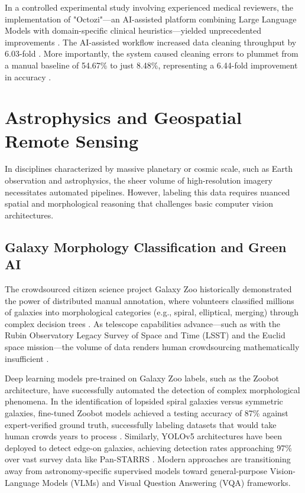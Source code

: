 \documentclass[conference]{IEEEtran}
\begin{document}
In a controlled experimental study involving experienced medical reviewers, the implementation of "Octozi"---an AI-assisted platform combining Large Language Models with domain-specific clinical heuristics---yielded unprecedented improvements \cite{ref32}. The AI-assisted workflow increased data cleaning throughput by 6.03-fold \cite{ref32}. More importantly, the system caused cleaning errors to plummet from a manual baseline of 54.67\% to just 8.48\%, representing a 6.44-fold improvement in accuracy \cite{ref32}.

\section{Astrophysics and Geospatial Remote Sensing}
In disciplines characterized by massive planetary or cosmic scale, such as Earth observation and astrophysics, the sheer volume of high-resolution imagery necessitates automated pipelines. However, labeling this data requires nuanced spatial and morphological reasoning that challenges basic computer vision architectures.

\subsection{Galaxy Morphology Classification and Green AI}
The crowdsourced citizen science project Galaxy Zoo historically demonstrated the power of distributed manual annotation, where volunteers classified millions of galaxies into morphological categories (e.g., spiral, elliptical, merging) through complex decision trees \cite{ref37}. As telescope capabilities advance---such as with the Rubin Observatory Legacy Survey of Space and Time (LSST) and the Euclid space mission---the volume of data renders human crowdsourcing mathematically insufficient \cite{ref37}.

Deep learning models pre-trained on Galaxy Zoo labels, such as the Zoobot architecture, have successfully automated the detection of complex morphological phenomena. In the identification of lopsided spiral galaxies versus symmetric galaxies, fine-tuned Zoobot models achieved a testing accuracy of 87\% against expert-verified ground truth, successfully labeling datasets that would take human crowds years to process \cite{ref39}. Similarly, YOLOv5 architectures have been deployed to detect edge-on galaxies, achieving detection rates approaching 97\% over vast survey data like Pan-STARRS \cite{ref40}. Modern approaches are transitioning away from astronomy-specific supervised models toward general-purpose Vision-Language Models (VLMs) and Visual Question Answering (VQA) frameworks.
\end{document}
